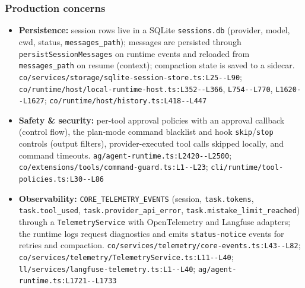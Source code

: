 \subsubsection*{Production concerns}
\begin{itemize}
\item \textbf{Persistence:} session rows live in a SQLite \texttt{sessions.\allowbreak{}db} (provider, model, cwd, status, \texttt{messages\_\allowbreak{}path}); messages are persisted through \texttt{persistSessionMessages} on runtime events and reloaded from \texttt{messages\_\allowbreak{}path} on resume (context); compaction state is saved to a sidecar. \texttt{co/\allowbreak{}services/\allowbreak{}storage/\allowbreak{}sqlite-\allowbreak{}session-\allowbreak{}store.\allowbreak{}ts:\allowbreak{}L25-\allowbreak{}-\allowbreak{}L90}; \texttt{co/\allowbreak{}runtime/\allowbreak{}host/\allowbreak{}local-\allowbreak{}runtime-\allowbreak{}host.\allowbreak{}ts:\allowbreak{}L352-\allowbreak{}-\allowbreak{}L366}, \texttt{L754-\allowbreak{}-\allowbreak{}L770}, \texttt{L1620-\allowbreak{}-\allowbreak{}L1627}; \texttt{co/\allowbreak{}runtime/\allowbreak{}host/\allowbreak{}history.\allowbreak{}ts:\allowbreak{}L418-\allowbreak{}-\allowbreak{}L447}
\item \textbf{Safety \& security:} per-tool approval policies with an approval callback (control flow), the plan-mode command blacklist and hook \texttt{skip}/\texttt{stop} controls (output filters), provider-executed tool calls skipped locally, and command timeouts. \texttt{ag/\allowbreak{}agent-\allowbreak{}runtime.\allowbreak{}ts:\allowbreak{}L2420-\allowbreak{}-\allowbreak{}L2500}; \texttt{co/\allowbreak{}extensions/\allowbreak{}tools/\allowbreak{}command-\allowbreak{}guard.\allowbreak{}ts:\allowbreak{}L1-\allowbreak{}-\allowbreak{}L23}; \texttt{cli/\allowbreak{}runtime/\allowbreak{}tool-\allowbreak{}policies.\allowbreak{}ts:\allowbreak{}L30-\allowbreak{}-\allowbreak{}L86}
\item \textbf{Observability:} \texttt{CORE\_\allowbreak{}TELEMETRY\_\allowbreak{}EVENTS} (session, \texttt{task.\allowbreak{}tokens}, \texttt{task.\allowbreak{}tool\_\allowbreak{}used}, \texttt{task.\allowbreak{}provider\_\allowbreak{}api\_\allowbreak{}error}, \texttt{task.\allowbreak{}mistake\_\allowbreak{}limit\_\allowbreak{}reached}) through a \texttt{TelemetryService} with OpenTelemetry and Langfuse adapters; the runtime logs request diagnostics and emits \texttt{status-\allowbreak{}notice} events for retries and compaction. \texttt{co/\allowbreak{}services/\allowbreak{}telemetry/\allowbreak{}core-\allowbreak{}events.\allowbreak{}ts:\allowbreak{}L43-\allowbreak{}-\allowbreak{}L82}; \texttt{co/\allowbreak{}services/\allowbreak{}telemetry/\allowbreak{}TelemetryService.\allowbreak{}ts:\allowbreak{}L11-\allowbreak{}-\allowbreak{}L40}; \texttt{ll/\allowbreak{}services/\allowbreak{}langfuse-\allowbreak{}telemetry.\allowbreak{}ts:\allowbreak{}L1-\allowbreak{}-\allowbreak{}L40}; \texttt{ag/\allowbreak{}agent-\allowbreak{}runtime.\allowbreak{}ts:\allowbreak{}L1721-\allowbreak{}-\allowbreak{}L1733}

\end{itemize}
